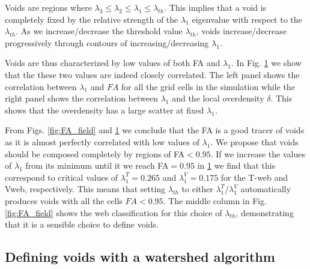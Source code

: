 \documentclass[a4,useAMS,usenatbib,usegraphicx]{mn2e}
\begin{document}
\begin{figure}

  \label{fig:L1_correlations}

\end{figure}


Voids are regions where $\lambda_3\leq\lambda_2\leq
\lambda_1\leq\lambda_{th}$. 
This implies that a void is completely fixed by the relative strength
of the $\lambda_1$ eigenvalue with respect to the $\lambda_{th}$.   
As we  increase/decrease the threshold value $\lambda_{th}$, voids
increase/decrease progressively through contours of
increasing/decreasing $\lambda_1$.   
 
Voids are thus characterized by low values of both FA and
$\lambda_1$. 
In Fig. \ref{fig:L1_correlations} we show that the these two values
are indeed closely correlated.  
The left panel shows the correlation between $\lambda_1$ and $FA$ for
all the grid cells in the simulation while the right panel shows the
correlation between $\lambda_1$ and the local overdensity $\delta$.  
This shows that the overdensity has a large scatter at fixed
$\lambda_1$. 

From Figs. \ref{fig:FA_field} and \ref{fig:L1_correlations} we
conclude that the FA is a good tracer of voids as it is almost perfectly
correlated with low values of $\lambda_1$. 
We propose that voids should be composed completely by regions of
FA$<0.95$.
If we increase the values of $\lambda_1$ from its minimum until it
we reach FA$=0.95$ in \ref{fig:L1_correlations} we find that this
correspond to critical values of $\lambda_{1}^T = 0.265$ and
$\lambda_{1}^V = 0.175$ for the T-web and Vweb, respectively.
This means that setting $\lambda_{th}$ to either
$\lambda_{1}^T$/$\lambda_{1}^{V}$ automatically produces voids with
all the cells $FA<0.95$.   
The middle column in Fig. \ref{fig:FA_field} shows the web
classification for this choice of $\lambda_{th}$, demonstrating that
it is a sensible choice to define voids. 

   
\subsection{Defining voids with a watershed algorithm}
\label{sec:watershed}
\end{document}
